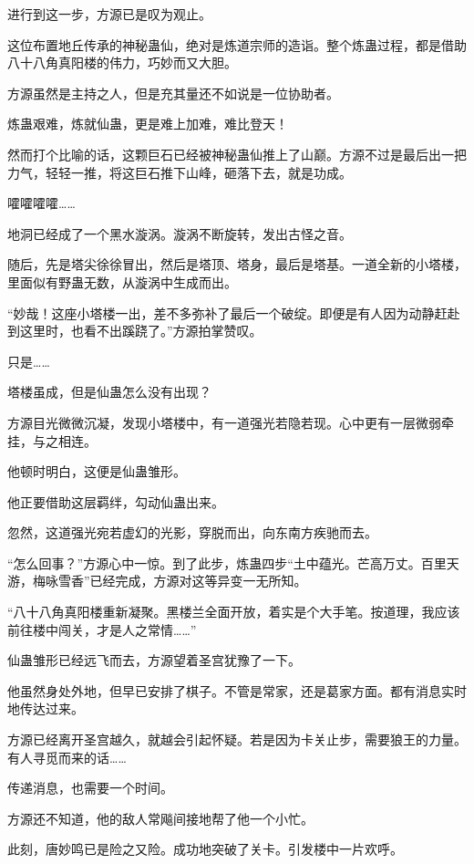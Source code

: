 
\begin{this_body}

进行到这一步，方源已是叹为观止。

这位布置地丘传承的神秘蛊仙，绝对是炼道宗师的造诣。整个炼蛊过程，都是借助八十八角真阳楼的伟力，巧妙而又大胆。

方源虽然是主持之人，但是充其量还不如说是一位协助者。

炼蛊艰难，炼就仙蛊，更是难上加难，难比登天！

然而打个比喻的话，这颗巨石已经被神秘蛊仙推上了山巅。方源不过是最后出一把力气，轻轻一推，将这巨石推下山峰，砸落下去，就是功成。

嚯嚯嚯嚯……

地洞已经成了一个黑水漩涡。漩涡不断旋转，发出古怪之音。

随后，先是塔尖徐徐冒出，然后是塔顶、塔身，最后是塔基。一道全新的小塔楼，里面似有野蛊无数，从漩涡中生成而出。

“妙哉！这座小塔楼一出，差不多弥补了最后一个破绽。即便是有人因为动静赶赴到这里时，也看不出蹊跷了。”方源拍掌赞叹。

只是……

塔楼虽成，但是仙蛊怎么没有出现？

方源目光微微沉凝，发现小塔楼中，有一道强光若隐若现。心中更有一层微弱牵挂，与之相连。

他顿时明白，这便是仙蛊雏形。

他正要借助这层羁绊，勾动仙蛊出来。

忽然，这道强光宛若虚幻的光影，穿脱而出，向东南方疾驰而去。

“怎么回事？”方源心中一惊。到了此步，炼蛊四步“土中蕴光。芒高万丈。百里天游，梅咏雪香”已经完成，方源对这等异变一无所知。

“八十八角真阳楼重新凝聚。黑楼兰全面开放，着实是个大手笔。按道理，我应该前往楼中闯关，才是人之常情……”

仙蛊雏形已经远飞而去，方源望着圣宫犹豫了一下。

他虽然身处外地，但早已安排了棋子。不管是常家，还是葛家方面。都有消息实时地传达过来。

方源已经离开圣宫越久，就越会引起怀疑。若是因为卡关止步，需要狼王的力量。有人寻觅而来的话……

传递消息，也需要一个时间。

方源还不知道，他的敌人常飚间接地帮了他一个小忙。

此刻，唐妙鸣已是险之又险。成功地突破了关卡。引发楼中一片欢呼。


\end{this_body}
